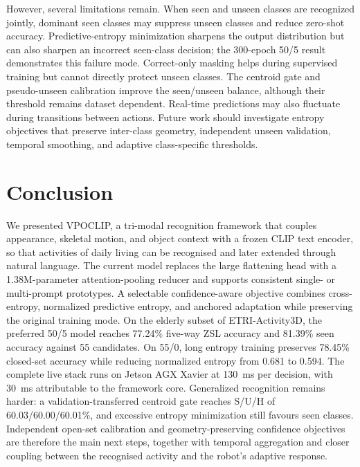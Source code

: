 \documentclass[conference]{IEEEtran}
\begin{document}
However, several limitations remain. When seen and unseen classes are recognized jointly, dominant seen classes may suppress unseen classes and reduce zero-shot accuracy. Predictive-entropy minimization sharpens the output distribution but can also sharpen an incorrect seen-class decision; the 300-epoch 50/5 result demonstrates this failure mode. Correct-only masking helps during supervised training but cannot directly protect unseen classes. The centroid gate and pseudo-unseen calibration improve the seen/unseen balance, although their threshold remains dataset dependent. Real-time predictions may also fluctuate during transitions between actions. Future work should investigate entropy objectives that preserve inter-class geometry, independent unseen validation, temporal smoothing, and adaptive class-specific thresholds.

\section{Conclusion}

We presented VPOCLIP, a tri-modal recognition framework that couples appearance, skeletal motion, and object context with a frozen CLIP text encoder, so that activities of daily living can be recognised and later extended through natural language. The current model replaces the large flattening head with a 1.38M-parameter attention-pooling reducer and supports consistent single- or multi-prompt prototypes. A selectable confidence-aware objective combines cross-entropy, normalized predictive entropy, and anchored adaptation while preserving the original training mode. On the elderly subset of ETRI-Activity3D, the preferred 50/5 model reaches 77.24\% five-way ZSL accuracy and 81.39\% seen accuracy against 55 candidates. On 55/0, long entropy training preserves 78.45\% closed-set accuracy while reducing normalized entropy from 0.681 to 0.594. The complete live stack runs on Jetson AGX Xavier at 130~ms per decision, with 30~ms attributable to the framework core. Generalized recognition remains harder: a validation-transferred centroid gate reaches S/U/H of 60.03/60.00/60.01\%, and excessive entropy minimization still favours seen classes. Independent open-set calibration and geometry-preserving confidence objectives are therefore the main next steps, together with temporal aggregation and closer coupling between the recognised activity and the robot's adaptive response.
\end{document}
